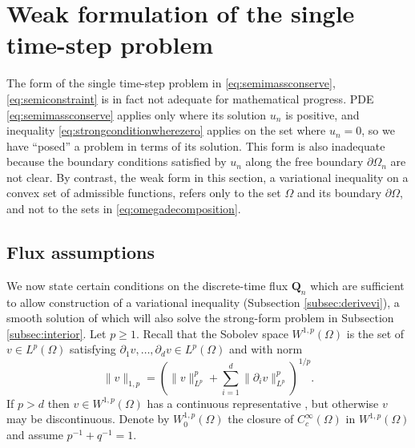 \documentclass[final,onefignum]{siamart190516}
\newcommand\bQ{\mathbf{Q}}
\begin{document}
\section{Weak formulation of the single time-step problem}  \label{sec:weakform}

The form of the single time-step problem in \eqref{eq:semimassconserve}, \eqref{eq:semiconstraint} is in fact not adequate for mathematical progress.  PDE \eqref{eq:semimassconserve} applies only where its solution $u_n$ is positive, and inequality \eqref{eq:strongconditionwherezero} applies on the set where $u_n=0$, so we have ``posed'' a problem in terms of its solution.  This form is also inadequate because the boundary conditions satisfied by $u_n$ along the free boundary $\partial\Omega_n$ are not clear.  By contrast, the weak form in this section, a variational inequality \cite{Friedman1982,KinderlehrerStampacchia1980} on a convex set of admissible functions, refers only to the set $\Omega$ and its boundary $\partial\Omega$, and not to the sets in \eqref{eq:omegadecomposition}.

\subsection{Flux assumptions} \label{subsec:fluxassumptions}  We now state certain conditions on the discrete-time flux $\bQ_n$ which are sufficient to allow construction of a variational inequality (Subsection \ref{subsec:derivevi}), a smooth solution of which will also solve the strong-form problem in Subsection \ref{subsec:interior}.  Let $p\ge 1$.  Recall that the Sobolev space $W^{1,p}(\Omega)$ \cite{Evans2010} is the set of $v \in L^p(\Omega)$ satisfying $\partial_1 v,\dots,\partial_d v \in L^p(\Omega)$ and with norm
\begin{equation}
  \|v\|_{1,p} = \left(\|v\|_{L^p}^p + \sum_{i=1}^d \|\partial_i v\|_{L^p}^p\right)^{1/p}.  \label{eq:norm}
\end{equation}
If $p>d$ then $v\in W^{1,p}(\Omega)$ has a continuous representative \cite[``Morrey's inequality'']{Evans2010}, but otherwise $v$ may be discontinuous.  Denote by $W_0^{1,p}(\Omega)$ the closure of $C_c^\infty(\Omega)$ in $W^{1,p}(\Omega)$ and assume $p^{-1} + q^{-1} = 1$.
\end{document}
